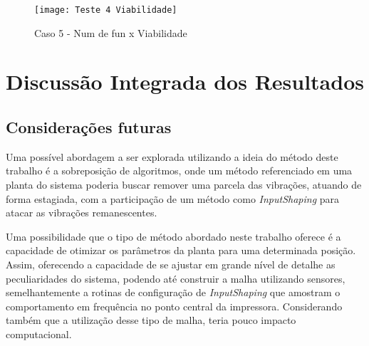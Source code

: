 \begin{figure}[H]
    \begin{center}
    \caption{Caso 5 - Num de fun x Viabilidade}
    \texttt{[image: Teste 4 Viabilidade]}
    \label{fig:t_4_viab}
    \end{center}
\end{figure}

\section{Discussão Integrada dos Resultados}

\subsection{Considerações futuras}
Uma possível abordagem a ser explorada utilizando a ideia do método deste trabalho é a sobreposição de algoritmos, onde
um método referenciado em uma planta do sistema poderia buscar remover uma parcela das vibrações, atuando de forma estagiada,
com a participação de um método como \textit{InputShaping} para atacar as vibrações remanescentes.

Uma possibilidade que o tipo de método abordado neste trabalho oferece é a capacidade de otimizar os parâmetros da planta para uma determinada posição.
Assim, oferecendo a capacidade de se ajustar em grande nível de detalhe as peculiaridades do sistema, podendo até
construir a malha utilizando sensores, semelhantemente a rotinas de configuração de \textit{InputShaping} que amostram
o comportamento em frequência no ponto central da impressora. Considerando também que a utilização desse tipo de malha,
teria pouco impacto computacional.


